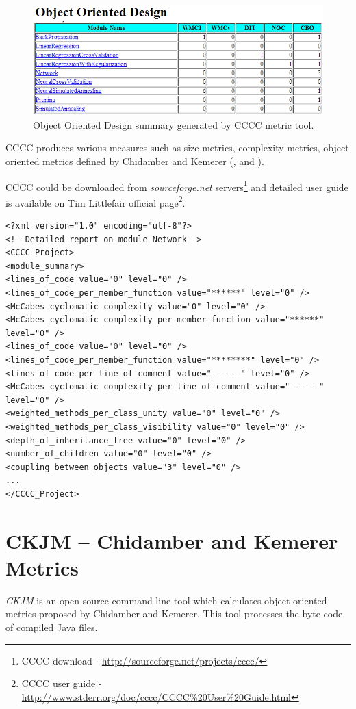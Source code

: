 \begin{figure}[h!]
	\centering
	\includegraphics[scale=0.6]{img/cccc2.png} 
	\caption{Object Oriented Design summary generated by CCCC metric tool.}		
	\label{fig:cccc2}
\end{figure}

CCCC produces various measures such as size metrics, complexity metrics, object oriented metrics defined by Chidamber and Kemerer (\cite{indie}, \cite{vaxjo} and \cite{cccc1}).

CCCC could be downloaded from \textit{sourceforge.net} servers\footnote{CCCC download - \url{http://sourceforge.net/projects/cccc/}} and detailed user guide is available on Tim Littlefair official page\footnote{CCCC user guide - \url{http://www.stderr.org/doc/cccc/CCCC\%20User\%20Guide.html}}.

\begin{lstlisting}[caption=XML representation of results generated by CCCC metric tool, label=ccccXml]
<?xml version="1.0" encoding="utf-8"?>
<!--Detailed report on module Network-->
<CCCC_Project>
<module_summary>
<lines_of_code value="0" level="0" />
<lines_of_code_per_member_function value="******" level="0" />
<McCabes_cyclomatic_complexity value="0" level="0" />
<McCabes_cyclomatic_complexity_per_member_function value="******" level="0" />
<lines_of_code value="0" level="0" />
<lines_of_code_per_member_function value="********" level="0" />
<lines_of_code_per_line_of_comment value="------" level="0" />
<McCabes_cyclomatic_complexity_per_line_of_comment value="------" level="0" />
<weighted_methods_per_class_unity value="0" level="0" />
<weighted_methods_per_class_visibility value="0" level="0" />
<depth_of_inheritance_tree value="0" level="0" />
<number_of_children value="0" level="0" />
<coupling_between_objects value="3" level="0" />
...
</CCCC_Project>
\end{lstlisting}

\section{CKJM -- Chidamber and Kemerer Metrics}
\textit{CKJM} is an open source command-line tool which calculates object-oriented metrics proposed by Chidamber and Kemerer. This tool processes the byte-code of compiled Java files. 

